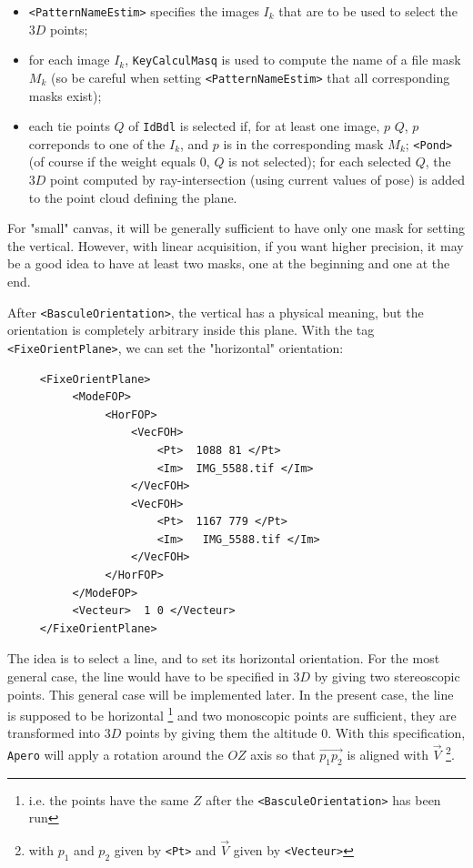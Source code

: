 \begin{itemize}
   \item {\tt <PatternNameEstim>} specifies the images $I_k$ that are to be used to
         select the $3D$ points;

   \item for each image $I_k$, {\tt KeyCalculMasq} is used to compute the name
         of  a file mask $M_k$ (so be careful when setting {\tt <PatternNameEstim>}
         that all corresponding masks exist);


   \item   each tie points $Q$  of  {\tt IdBdl} is selected if,  for at least one
           image, $p$  $Q$, $p$ correponds to one of the $I_k$, and $p$ is
           in the corresponding mask $M_k$;  {\tt <Pond>} (of course if the
           weight equals $0$, $Q$ is not selected);   for each selected $Q$,
           the $3D$ point computed by ray-intersection (using current values of pose)
           is added to the point cloud defining the plane.
\end{itemize}

For "small" canvas, it will be generally sufficient to have only one mask for
setting the vertical. However, with linear acquisition, if you want higher precision,
it may be a good idea to have at least two masks, one at the beginning and one at
the end.


After  {\tt  <BasculeOrientation>}, the vertical has a physical meaning, but the orientation
is completely arbitrary inside this plane. With the tag {\tt <FixeOrientPlane>},
we can set the "horizontal" orientation:


{\scriptsize
\begin{verbatim}
     <FixeOrientPlane>
          <ModeFOP>
               <HorFOP>
                   <VecFOH>
                       <Pt>  1088 81 </Pt>
                       <Im>  IMG_5588.tif </Im>
                   </VecFOH>
                   <VecFOH>
                       <Pt>  1167 779 </Pt>
                       <Im>   IMG_5588.tif </Im>
                   </VecFOH>
               </HorFOP>
          </ModeFOP>
          <Vecteur>  1 0 </Vecteur>
     </FixeOrientPlane>
\end{verbatim}
}

The idea is to select a  line, and to set its horizontal orientation.
For the most general case, the line  would have to be specified in $3D$ by
giving two stereoscopic points. This general case will be implemented
later. In the present case, the line is supposed to be horizontal
\footnote{i.e. the points have the same $Z$ after the {\tt <BasculeOrientation>}
has been run} and two monoscopic points are sufficient, they are transformed into $3D$ points
by giving them the altitude $0$. With this specification,
{\tt Apero} will apply a rotation around the $OZ$ axis so that
$\overrightarrow{p_1p_2} $ is aligned with $\vec{V}$ \footnote{with $p_1$
and $p_2$ given by {\tt <Pt>} and $\vec{V}$ given by {\tt <Vecteur>}}.


